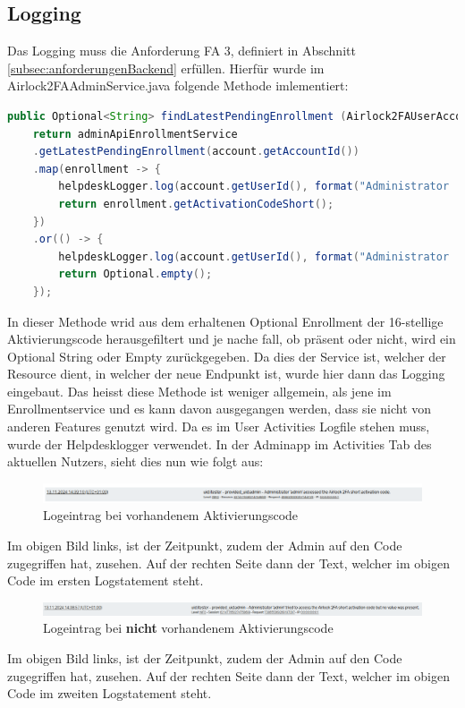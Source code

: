 \subsection{Logging}
Das Logging muss die Anforderung \flqq FA 3\frqq , definiert in Abschnitt \ref{subsec:anforderungenBackend} erfüllen. Hierfür wurde im Airlock2FAAdminService.java folgende Methode imlementiert:
\begin{lstlisting}[language=Java]
public Optional<String> findLatestPendingEnrollment (Airlock2FAUserAccount account) {
	return adminApiEnrollmentService
	.getLatestPendingEnrollment(account.getAccountId())
	.map(enrollment -> {
		helpdeskLogger.log(account.getUserId(), format("Administrator '%s' accessed the Airlock 2FA short activation code.", administrator.getName()));
		return enrollment.getActivationCodeShort();
	})
	.or(() -> {
		helpdeskLogger.log(account.getUserId(), format("Administrator '%s' tried to access the Airlock 2FA short activation code but no value was present.", administrator.getName()));
		return Optional.empty();
	});
\end{lstlisting}
In dieser Methode wrid aus dem erhaltenen Optional Enrollment der 16-stellige Aktivierungscode herausgefiltert und je nache fall, ob präsent oder nicht, wird ein Optional String oder Empty zurückgegeben. Da dies der Service ist, welcher der Resource dient, in welcher der neue Endpunkt ist, wurde hier dann das Logging eingebaut. Das heisst diese Methode ist weniger allgemein, als jene im Enrollmentservice und es kann davon ausgegangen werden, dass sie nicht von anderen Features genutzt wird. Da es im User Activities Logfile stehen muss, wurde der Helpdesklogger verwendet. In der Adminapp im Activities Tab des aktuellen Nutzers, sieht dies nun wie folgt aus:
\begin{figure}[H]
	\begin{center}
		\includegraphics[width=1.0\textwidth]{ressourcen/logpresent}
		\caption[Logeintrag bei vorhandenem Aktivierungscode]{Logeintrag bei vorhandenem Aktivierungscode}\label{fig:logpresent}
	\end{center}
\end{figure}
\noindent Im obigen Bild links, ist der Zeitpunkt, zudem der Admin auf den Code zugegriffen hat, zusehen. Auf der rechten Seite dann der Text, welcher im obigen Code im ersten Logstatement steht. 
\begin{figure}[H]
	\begin{center}
		\includegraphics[width=1.0\textwidth]{ressourcen/lognotpresent}
		\caption[Logeintrag bei \textbf{nicht} vorhandenem Aktivierungscode]{Logeintrag bei \textbf{nicht} vorhandenem Aktivierungscode}\label{fig:lognotpresent}
	\end{center}
\end{figure}
\noindent Im obigen Bild links, ist der Zeitpunkt, zudem der Admin auf den Code zugegriffen hat, zusehen. Auf der rechten Seite dann der Text, welcher im obigen Code im zweiten Logstatement steht.  


